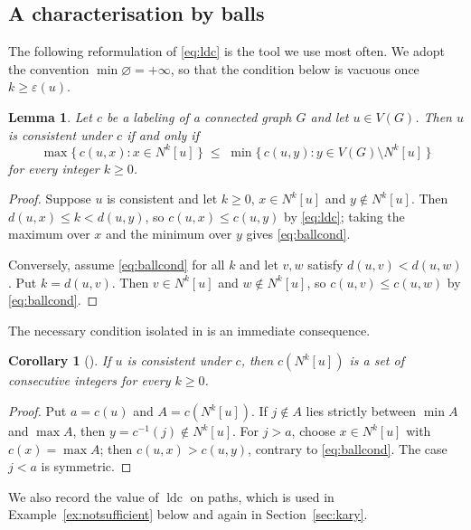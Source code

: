\documentclass[reqno,10pt]{article}
\newtheorem{lemma}[theorem]{Lemma}
\newtheorem{corollary}[theorem]{Corollary}
\theoremstyle{definition}
\numberwithin{equation}{section}
\numberwithin{theorem}{section}
\newcommand{\ldc}{\operatorname{ldc}}
\newcommand{\ecc}{\varepsilon}
\newcommand{\Ball}[2]{N^{#2}[#1]}
\begin{document}
\subsection{A characterisation by balls}

The following reformulation of \eqref{eq:ldc} is the tool we use most often.
We adopt the convention $\min\varnothing=+\infty$, so that the condition below is
vacuous once $k\ge\ecc(u)$.

\begin{lemma}
\label{lem:ball}
Let $c$ be a labeling of a connected graph $G$ and let $u\in V(G)$. Then $u$ is
consistent under $c$ if and only if
\begin{equation}
  \max\bigl\{\,c(u,x) : x\in \Ball{u}{k}\,\bigr\}
  \;\le\;
  \min\bigl\{\,c(u,y) : y\in V(G)\setminus \Ball{u}{k}\,\bigr\}
  \label{eq:ballcond}
\end{equation}
for every integer $k\ge0$.
\end{lemma}

\begin{proof}
Suppose $u$ is consistent and let $k\ge0$, $x\in\Ball{u}{k}$ and
$y\notin\Ball{u}{k}$. Then $d(u,x)\le k<d(u,y)$, so $c(u,x)\le c(u,y)$ by
\eqref{eq:ldc}; taking the maximum over $x$ and the minimum over $y$ gives
\eqref{eq:ballcond}.

Conversely, assume \eqref{eq:ballcond} for all $k$ and let $v,w$ satisfy
$d(u,v)<d(u,w)$. Put $k=d(u,v)$. Then $v\in\Ball{u}{k}$ and
$w\notin\Ball{u}{k}$, so $c(u,v)\le c(u,w)$ by \eqref{eq:ballcond}.
\end{proof}

The necessary condition isolated in \cite[Lemma 2.2]{CH2025} is an immediate
consequence.

\begin{corollary}[\cite{CH2025}]
\label{cor:interval}
If $u$ is consistent under $c$, then $c(\Ball{u}{k})$ is a set of consecutive
integers for every $k\ge0$.
\end{corollary}

\begin{proof}
Put $a=c(u)$ and $A=c(\Ball{u}{k})$. If $j\notin A$ lies strictly between
$\min A$ and $\max A$, then $y=c^{-1}(j)\notin\Ball{u}{k}$. For $j>a$, choose
$x\in\Ball{u}{k}$ with $c(x)=\max A$; then $c(u,x)>c(u,y)$, contrary to
\eqref{eq:ballcond}. The case $j<a$ is symmetric.
\end{proof}

We also record the value of $\ldc$ on paths, which is used in
Example~\ref{ex:notsufficient} below and again in Section~\ref{sec:kary}.
\end{document}
